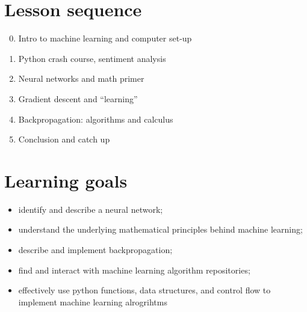 \documentclass[11pt]{article}
\begin{document}
\vfill
\section*{Lesson sequence}

\begin{enumerate}
    \setcounter{enumi}{-1}
  \item Intro to machine learning and computer set-up
  \item Python crash course, sentiment analysis
  \item Neural networks and math primer
  \item Gradient descent and ``learning''
  \item Backpropagation: algorithms and calculus
  \item Conclusion and catch up
\end{enumerate}

\section*{Learning goals}

\begin{itemize}
  \item identify and describe a neural network;
  \item understand the underlying mathematical principles behind machine learning;
  \item describe and implement backpropagation;
  \item find and interact with machine learning algorithm repositories;
  \item effectively use python functions, data structures, and control flow to
    implement machine learning alrogrihtms
\end{itemize}
\end{document}
